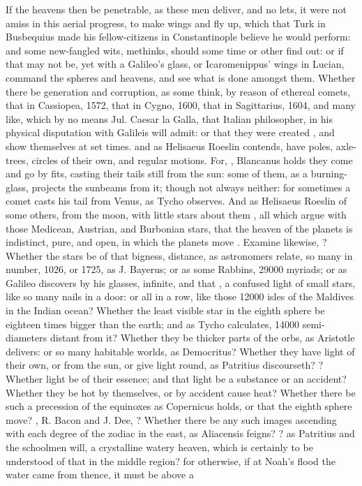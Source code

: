 {If the heavens then be penetrable, as these men deliver, and no lets, it were not amiss in this aerial progress, to make wings and fly up, which that Turk in Busbequius made his fellow-citizens in Constantinople believe he would perform: and some new-fangled wits, methinks, should some time or other find out: or if that may not be, yet with a Galileo's glass, or Icaromenippus' wings in Lucian, command the spheres and heavens, and see what is done amongst them. Whether there be generation and corruption, as some think, by reason of ethereal comets, that in Cassiopea, 1572, that in Cygno, 1600, that in Sagittarius, 1604, and many like, which by no means Jul. Caesar la Galla, that Italian philosopher, in his physical disputation with Galileis  will admit: or that they were created , and show themselves at set times. and as Helisaeus Roeslin contends, have poles, axle-trees, circles of their own, and regular motions. For, , Blancanus holds they come and go by fits, casting their tails still from the sun: some of them, as a burning-glass, projects the sunbeams from it; though not always neither: for sometimes a comet casts his tail from Venus, as Tycho observes. And as Helisaeus Roeslin of some others, from the moon, with little stars about them , all which argue with those Medicean, Austrian, and Burbonian stars, that the heaven of the planets is indistinct, pure, and open, in which the planets move . Examine likewise, ? Whether the stars be of that bigness, distance, as astronomers relate, so many in number, 1026, or 1725, as J. Bayerus; or as some Rabbins, 29\thinspace{}000 myriads; or as Galileo discovers by his glasses, infinite, and that , a confused light of small stars, like so many nails in a door: or all in a row, like those 12\thinspace{}000 isles of the Maldives in the Indian ocean? Whether the least visible star in the eighth sphere be eighteen times bigger than the earth; and as Tycho calculates, 14\thinspace{}000 semi-diameters distant from it? Whether they be thicker parts of the orbs, as Aristotle delivers: or so many habitable worlds, as Democritus? Whether they have light of their own, or from the sun, or give light round, as Patritius discourseth? ? Whether light be of their essence; and that light be a substance or an accident? Whether they be hot by themselves, or by accident cause heat? Whether there be such a precession of the equinoxes as Copernicus holds, or that the eighth sphere move? , R. Bacon and J. Dee, ? Whether there be any such images ascending with each degree of the zodiac in the east, as Aliacensis feigns? ? as Patritius and the schoolmen will, a crystalline watery heaven, which is certainly to be understood of that in the middle region? for otherwise, if at Noah's flood the water came from thence, it must be above a }
